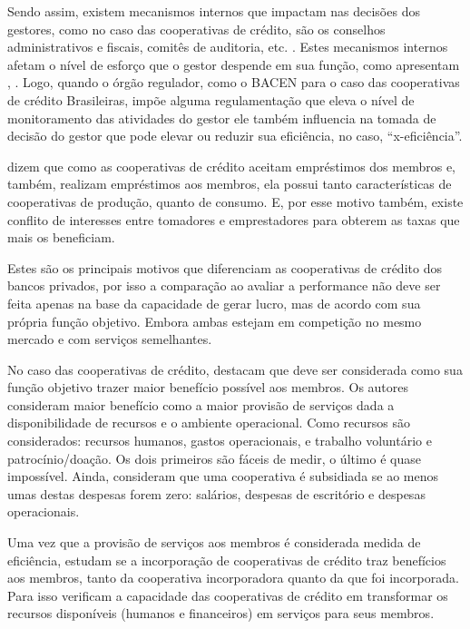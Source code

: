 \documentclass[ppgcc]{fearp}
\begin{document}
Sendo assim, existem mecanismos internos que impactam nas decisões dos gestores, como no caso das cooperativas de crédito, são os conselhos administrativos e fiscais, comitês de auditoria, etc. \cite{gillan2006}. Estes mecanismos internos afetam o nível de esforço que o gestor despende em sua função, como apresentam , . Logo, quando o órgão regulador, como o BACEN para o caso das cooperativas de crédito Brasileiras, impõe alguma regulamentação que eleva o nível de monitoramento das atividades do gestor ele também influencia na tomada de decisão do gestor que pode elevar ou reduzir sua eficiência, no caso, “x-eficiência”.

 dizem que como as cooperativas de crédito aceitam empréstimos dos membros e, também, realizam empréstimos aos membros, ela possui tanto características de cooperativas de produção, quanto de consumo. E, por esse motivo também, existe conflito de interesses entre tomadores e emprestadores para obterem as taxas que mais os beneficiam. 

Estes são os principais motivos que diferenciam as cooperativas de crédito dos bancos privados, por isso a comparação ao avaliar a performance não deve ser feita apenas na base da capacidade de gerar lucro, mas de acordo com sua própria função objetivo. Embora ambas estejam em competição no mesmo mercado e com serviços semelhantes. 

No caso das cooperativas de crédito,  destacam que deve ser considerada como sua função objetivo trazer maior benefício possível aos membros. Os autores consideram maior benefício como a maior provisão de serviços dada a disponibilidade de recursos e o ambiente operacional. Como recursos são considerados: recursos humanos, gastos operacionais, e trabalho voluntário e patrocínio/doação. Os dois primeiros são fáceis de medir, o último é quase impossível. Ainda, consideram que uma cooperativa é subsidiada se ao menos umas destas despesas forem zero: salários, despesas de escritório e despesas operacionais.

Uma vez que a provisão de serviços aos membros é considerada medida de eficiência,  estudam se a incorporação de cooperativas de crédito traz benefícios aos membros, tanto da cooperativa incorporadora quanto da que foi incorporada. Para isso verificam a capacidade das cooperativas de crédito em transformar os recursos disponíveis (humanos e financeiros) em serviços para seus membros.
\end{document}
